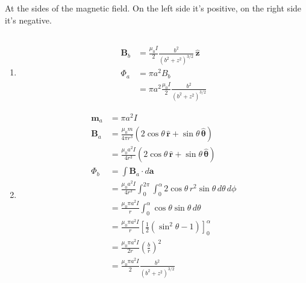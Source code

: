 \documentclass{article}
\renewcommand{\vec}[1]{\boldsymbol{\mathbf{#1}}}
\newcommand{\uvec}[1]{\hat{\vec{#1}}}
\begin{document}
\setcounter{subsection}{19}
\subsection{}

At the sides of the magnetic field. On the left side it's positive, on the right side it's negative.

\setcounter{subsection}{21}
\subsection{}

\begin{enumerate}
  \item

        \begin{align*}
          \vec{B}_b & = \frac{\mu_0 I}{2} \frac{b^2}{(b^2 + z^2)^{3 / 2}} \,\uvec{z} \\
          \Phi_a    & = \pi a^2 B_b                                                  \\
                    & = \pi a^2 \frac{\mu_0 I}{2} \frac{b^2}{(b^2 + z^2)^{3 / 2}}
        \end{align*}

  \item

        \begin{align*}
          \vec{m}_a & = \pi a^2 I                                                                                                  \\
          \vec{B}_a & = \frac{\mu_0 m}{4 \pi r^3} (2 \cos \theta \,\uvec{r} + \sin \theta \,\uvec{\theta})                         \\
                    & = \frac{\mu_0 a^2 I}{4 r^3} (2 \cos \theta \,\uvec{r} + \sin \theta \,\uvec{\theta})                         \\
          \Phi_b    & = \int \vec{B}_a \cdot d \vec{a}                                                                             \\
                    & = \frac{\mu_0 a^2 I}{4 r^3} \int_0^{2 \pi} \int_0^\alpha 2 \cos \theta \,r^2 \sin \theta \,d \theta \,d \phi \\
                    & = \frac{\mu_0 \pi a^2 I}{r} \int_0^\alpha \cos \theta \sin \theta \,d \theta                                 \\
                    & = \frac{\mu_0 \pi a^2 I}{r} \left[ \frac{1}{2} \left( \sin^2 \theta - 1 \right) \right]_0^\alpha             \\
                    & = \frac{\mu_0 \pi a^2 I}{2r} \left( \frac{b}{r} \right)^2                                                    \\
                    & = \frac{\mu_0 \pi a^2 I}{2} \frac{b^2}{(b^2 + z^2)^{3 / 2}}
        \end{align*}


\end{enumerate}
\end{document}
